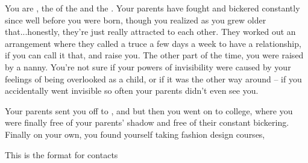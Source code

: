 \documentclass[char]{LRSguildcamp1}
\begin{document}
\name{\cGrad{}}
You are \cGrad{\intro}, the \cGrad{\offspring} of the \cOldest{\villain} \cOldest{\intro} and the \cOS{\hero} \cOS{\intro}.  Your parents have fought and bickered constantly since well before you were born, though you realized as you grew older that...honestly, they're just really attracted to each other.  They worked out an arrangement where they called a truce a few days a week to have a relationship, if you can call it that, and raise you.  The other part of the time, you were raised by a nanny.  You're not sure if your powers of invisibility were caused by your feelings of being overlooked as a child, or if it was the other way around -- if you accidentally went invisible so often your parents didn't even see you.  

Your parents sent you off to \pSuperSchool{}, and but then you went on to college, where you were finally free of your parents' shadow and free of their constant bickering.  Finally on your own, you found yourself taking fashion design courses,  

\begin{itemz}[Goals]
	\item 
\end{itemz}

\begin{itemz}[Notes]
	\item 
\end{itemz}

\begin{contacts}
	\contact{} This is the format for contacts 
\end{contacts}
\end{document}
